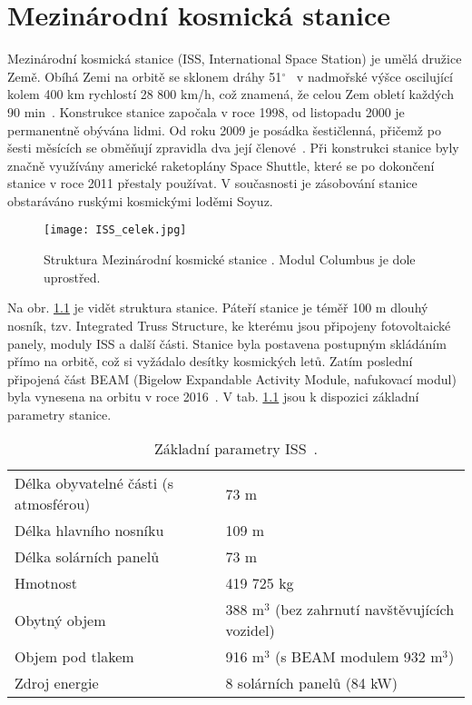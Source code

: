 %
\chapter{Mezinárodní kosmická stanice}
Mezinárodní kosmická stanice (ISS, International Space Station) je umělá družice Země. Obíhá Zemi na orbitě se sklonem dráhy 51$^{\circ}$~\cite{ISS_wiki} v nadmořské výšce oscilující kolem 400 km rychlostí 28 800 km/h, což znamená, že celou Zem obletí každých 90 min~\cite{ISS_where}. Konstrukce stanice započala v roce 1998, od listopadu 2000 je permanentně obývána lidmi. Od roku 2009 je posádka šestičlenná, přičemž po šesti měsících se obměňují zpravidla dva její členové~\cite{ISS_wiki}. Při konstrukci stanice byly značně využívány americké raketoplány Space Shuttle, které se po dokončení stanice v roce 2011 přestaly používat. V současnosti je zásobování stanice obstaráváno ruskými kosmickými loděmi Soyuz.
\begin{figure}[H]
  \centering
  \texttt{[image: ISS\_celek.jpg]}
  \caption{Struktura Mezinárodní kosmické stanice \cite{ISS_facts}. Modul Columbus je dole uprostřed.}
  \label{fig:ISS_celek}
\end{figure}

Na obr. \ref{fig:ISS_celek} je vidět struktura stanice. Páteří stanice je téměř 100 m dlouhý nosník, tzv. Integrated Truss Structure, ke kterému jsou připojeny fotovoltaické panely, moduly ISS a další části. Stanice byla postavena postupným skládáním přímo na orbitě, což si vyžádalo desítky kosmických letů. Zatím poslední připojená část BEAM (Bigelow Expandable Activity Module, nafukovací modul) byla vynesena na orbitu v roce 2016~\cite{ISS_gifs}. V tab. \ref{tab:ISS_parametry} jsou k dispozici základní parametry stanice.
\begin{table}[h]
  \centering
  \caption{Základní parametry ISS~\cite{ISS_facts}.}
  \label{tab:ISS_parametry}
  \begin{tabular}{ll}
    \toprule
    Délka obyvatelné části (s atmosférou)&73 m\\
    Délka hlavního nosníku&109 m\\
    Délka solárních panelů&73 m\\
    Hmotnost&419 725 kg\\
    Obytný objem& 388 m$^3$ (bez zahrnutí navštěvujících vozidel)\\
    Objem pod tlakem&916 m$^3$ (s BEAM modulem 932 m$^3$)\\
    Zdroj energie& 8 solárních panelů (84 kW)\\
    \bottomrule
  \end{tabular}
\end{table}

